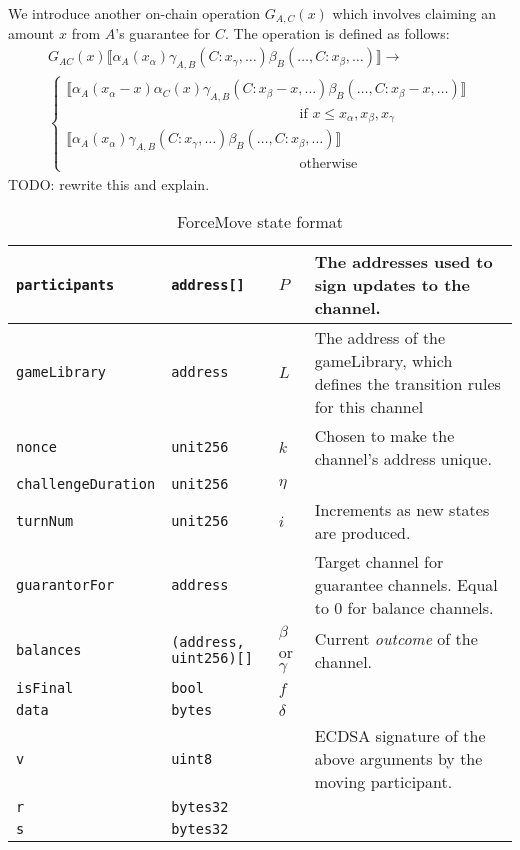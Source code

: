 \documentclass{article}
\theoremstyle{definition}
\newcommand{\adj}[1]{\llbracket #1 \rrbracket}
\begin{document}
We introduce another on-chain operation $G_{A, C}(x)$ which involves claiming an amount $x$ from $A$'s guarantee for $C$. The operation is defined as follows:
\begin{multline*}
G_{AC}(x) \adj{\alpha_A(x_\alpha)\gamma_{A,B}(C:x_\gamma, \dots)\beta_B(\dots, C:x_\beta, \dots)} \rightarrow \\
  \begin{cases}
      \adj{\alpha_A(x_\alpha - x)\alpha_C(x)\gamma_{A,B}(C:x_\beta -x, \dots)\beta_B(\dots, C:x_\beta - x, \dots)} \\
      \hspace{7cm} \text{if } x \leq x_\alpha, x_\beta, x_\gamma \\
      \adj{\alpha_A(x_\alpha)\gamma_{A,B}(C:x_\gamma, \dots)\beta_B(\dots, C:x_\beta, \dots)} \\
      \hspace{7cm} \text{otherwise}
  \end{cases}
\end{multline*}
TODO: rewrite this and explain.

\begin{table}[h]
  \begin{tabular}{|l|l|l|p{5cm}|}
    \hline
    \texttt{participants} & \texttt{address[]} & $P$ & The addresses used to sign updates to the channel. \\ \hline
    \texttt{gameLibrary} & \texttt{address} & $L$ & The address of the gameLibrary, which defines the transition rules for this channel \\ \hline
    \texttt{nonce} & \texttt{unit256} & $k$ & Chosen to make the channel's address unique. \\ \hline
    \texttt{challengeDuration} & \texttt{unit256} & $\eta$ & \\ \hline
    \texttt{turnNum} & \texttt{unit256} & $i$ & Increments as new states are produced. \\ \hline
    \texttt{guarantorFor} & \texttt{address} &  & Target channel for guarantee channels. Equal to 0 for balance channels. \\ \hline
    \texttt{balances} & \texttt{(address, uint256)[]} & $\beta$ or $\gamma$ & Current \textit{outcome} of the channel. \\ \hline
    \texttt{isFinal} & \texttt{bool} & $f$ & \\ \hline
    \texttt{data} & \texttt{bytes} & $\delta$ & \\ \hline
    \texttt{v} & \texttt{uint8} & &  ECDSA signature of the above arguments by the moving participant. \\ \cline{1-2}
    \texttt{r} & \texttt{bytes32} & & \\ \cline{1-2}
    \texttt{s} & \texttt{bytes32} & & \\ \hline
  \end{tabular}
  \caption{ForceMove state format}
  \label{table:force-move-state}
\end{table}
\end{document}
